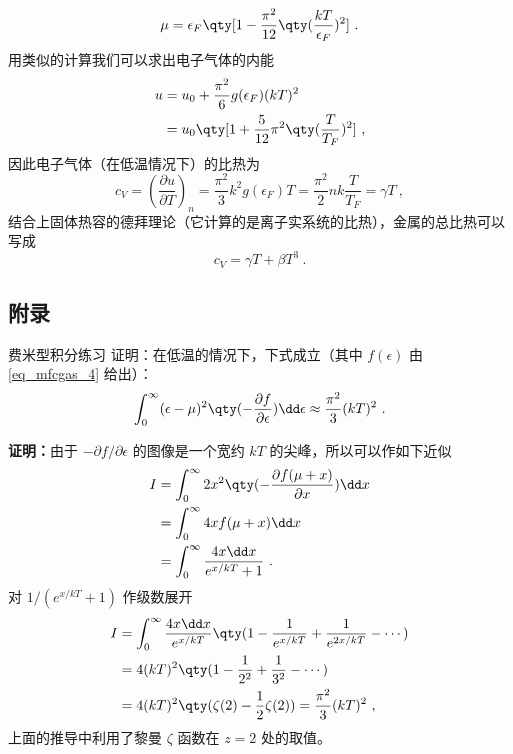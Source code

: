 \begin{equation}
\mu=\epsilon_F\qty[1-\frac{\pi^2}{12}\qty(\frac{kT}{\epsilon_F})^2]~.
\end{equation}
用类似的计算我们可以求出电子气体的内能
\begin{equation}
\begin{aligned}
u&=u_0+\frac{\pi^2}{6}g(\epsilon_F)(kT)^2\\
&=u_0\qty[1+\frac{5}{12}\pi^2\qty(\frac{T}{T_F})^2]~,
\end{aligned}
\end{equation}
因此电子气体（在低温情况下）的比热为
\begin{equation}
c_V=\left(\frac{\partial u}{\partial T}\right)_n=\frac{\pi^2}{3}k^2 g(\epsilon_F) T =\frac{\pi^2}{2}nk\frac{T}{T_F}= \gamma T~,
\end{equation}
结合上固体热容的德拜理论（它计算的是离子实系统的比热），金属的总比热可以写成
\begin{equation}
c_V=\gamma T+\beta T^3~.
\end{equation}
\subsection{附录}
\begin{lemma}{费米型积分练习}\label{lem_mfcgas_1}
证明：在低温的情况下，下式成立（其中 $f(\epsilon)$ 由 \autoref{eq_mfcgas_4} 给出）：
\begin{equation}
\int_0^\infty (\epsilon-\mu)^2 \qty(-\frac{\partial f}{\partial \epsilon})\dd\epsilon
\approx\frac{\pi^2}{3}(kT)^2~.
\end{equation}


\textbf{证明：}由于 $-\partial f/\partial \epsilon$ 的图像是一个宽约 $k T$ 的尖峰，所以可以作如下近似
\begin{equation}
\begin{aligned}
I&=\int_0^\infty 2x^2 \qty(-\frac{\partial f(\mu+x)}{\partial x}) \dd x\\
&=\int_0^\infty 4x f(\mu+x) \dd x\\
&=\int_0^\infty \frac{4x\dd x}{e^{x/kT}+1}~.
\end{aligned}
\end{equation}
对 $1/(e^{x/kT}+1)$ 作级数展开
\begin{equation}
\begin{aligned}
I&=\int_0^\infty \frac{4x\dd x}{e^{x/kT}}\qty(1-\frac{1}{e^{x/kT}}+\frac{1}{e^{2x/kT}}-\cdots)\\
&=4(kT)^2 \qty(1-\frac{1}{2^2}+\frac{1}{3^2}-\cdots)\\
&=4(kT)^2 \qty(\zeta(2)-\frac{1}{2}\zeta(2))=\frac{\pi^2}{3}(kT)^2~,
\end{aligned}
\end{equation}
上面的推导中利用了黎曼 $\zeta$ 函数在 $z=2$ 处的取值。
\end{lemma}
